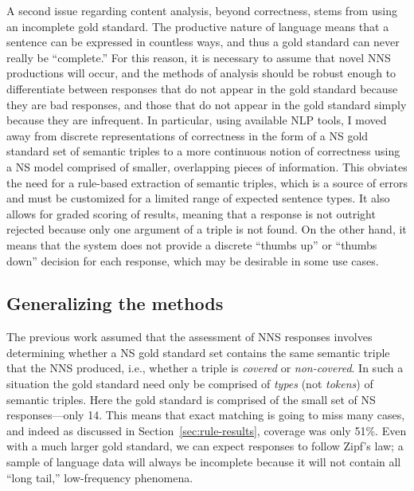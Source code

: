 A second issue regarding content analysis, beyond correctness, stems
from using an incomplete gold standard. The productive nature of language means that a sentence can be expressed in countless ways, and thus a gold standard can never really be ``complete.'' For this reason, it is necessary to assume that novel NNS productions will occur, and the methods of analysis should be robust enough to differentiate between responses that do not appear in the gold standard because they are bad responses, and those that do not appear in the gold standard simply because they are infrequent.
In particular, using available NLP tools, I moved away from discrete representations of correctness in the form of a NS gold standard set of semantic triples to a more continuous notion of correctness using a NS model comprised of smaller, overlapping pieces of information. This obviates the need for a rule-based extraction of semantic triples, which is a source of errors and must be customized for a limited range of expected sentence types. It also allows for graded scoring of results, meaning that a response is not outright rejected because only one argument of a triple is not found. On the other hand, it means that the system does not provide a discrete ``thumbs up'' or ``thumbs down'' decision for each response, which may be desirable in some use cases.


\subsection{Generalizing the methods}
\label{sec:ranking}

The previous work assumed that the assessment of NNS responses
involves determining whether a NS gold standard set contains the same
semantic triple that the NNS produced, i.e., whether a triple
is \textit{covered} or \textit{non-covered}.  In such a situation the
gold standard need only be comprised of \textit{types} (not \textit{tokens}) of semantic triples. Here the gold standard is comprised of the small set of NS responses---only 14. This means that exact matching is going to miss many cases,
and indeed as discussed in Section~\ref{sec:rule-results}, coverage was only 51\%. Even with a much larger gold standard, we can expect responses to follow Zipf's law; a sample of language data will always be incomplete because it will not contain all ``long tail,'' low-frequency phenomena.

